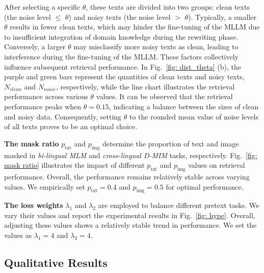 \documentclass[10pt,journal,compsoc]{IEEEtran}
\begin{document}
After selecting a specific \(\theta\), these texts are divided into two groups: clean texts (the noise level $\leq$ \(\theta\)) and noisy texts (the noise level $>$ \(\theta\)). Typically, a smaller \(\theta\) results in fewer clean texts, which may hinder the fine-tuning of the MLLM due to insufficient integration of domain knowledge during the rewriting phase. Conversely, a larger \(\theta\) may misclassify more noisy texts as clean, leading to interference during the fine-tuning of the MLLM. These factors collectively influence subsequent retrieval performance. 
In Fig.~\ref{fig: dist_theta} (b), the purple and green bars represent the quantities of clean texts and noisy texts, \(N_{clean}\) and \(N_{noise}\), respectively, while the line chart illustrates the retrieval performance across various \(\theta\) values.
It can be observed that the retrieval performance peaks when \(\theta = 0.15\), indicating a balance between the sizes of clean and noisy data. Consequently, setting \(\theta\) to the rounded mean value of noise levels of all texts proves to be an optimal choice.

\textbf{The mask ratio} \(p_{\text{txt}}\) and \(p_{\text{img}}\) determine the proportion of text and image masked in \emph{bi-lingual MLM} and \emph{cross-lingual D-MIM} tasks, respectively.  
Fig.~\ref{fig: mask ratio} illustrates the impact of different \(p_{\text{txt}}\) and \(p_{\text{img}}\) values on retrieval performance.  
Overall, the performance remains relatively stable across varying values. We empirically set \(p_{\text{txt}} = 0.4\) and \(p_{\text{img}} = 0.5\) for optimal performance.

\textbf{The loss weights} \(\lambda_1\) and \(\lambda_2\) are employed to balance different pretext tasks. We vary their values and report the experimental results in Fig.~\ref{fig: hype}. Overall, adjusting these values shows a relatively stable trend in performance. We set the values as \(\lambda_1 = 4\) and \(\lambda_2 = 4\).

\subsection{Qualitative Results}
\label{sec: qualitative results}
\end{document}
